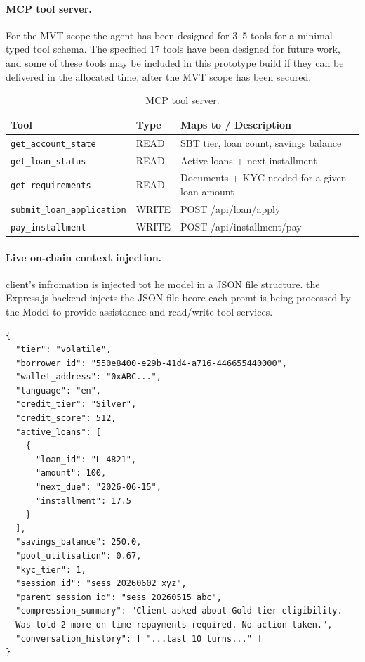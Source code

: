 \documentclass[12pt,a4paper]{report}
\newcommand{\tableheadcolor}{\rowcolor{TableHeadBg}}
\begin{document}
\paragraph{MCP tool server.} For the MVT scope the agent has been designed for 3--5 tools for a minimal typed tool schema. The specified 17 tools have been designed for future work, and some of these tools may be included in this prototype build if they can be delivered in the allocated time, after the MVT scope has been secured.

\begin{table}[H]
\centering
\caption[MCP tool server]{MCP tool server.}
\label{tab:mcp-tools}
\begin{tabular}{p{4.8cm}p{1.4cm}p{6.3cm}}
\toprule
\tableheadcolor
\textbf{Tool} & \textbf{Type} & \textbf{Maps to / Description} \\
\midrule
\texttt{get\_account\_state}       & READ & SBT tier, loan count, savings balance \\
\texttt{get\_loan\_status}         & READ & Active loans + next installment \\
\texttt{get\_requirements}         & READ & Documents + KYC needed for a given loan amount \\
\texttt{submit\_loan\_application} & WRITE & POST /api/loan/apply \\
\texttt{pay\_installment}          & WRITE & POST /api/installment/pay \\
\bottomrule
\end{tabular}
\end{table}

\paragraph{Live on-chain context injection.}
client's infromation is injected tot he model in a JSON file structure. the Express.js backend injects the JSON file beore each promt is being processed by the Model to provide assistacnce and read/write tool services.
\begin{verbatim}
{
  "tier": "volatile",
  "borrower_id": "550e8400-e29b-41d4-a716-446655440000",
  "wallet_address": "0xABC...",
  "language": "en",
  "credit_tier": "Silver",
  "credit_score": 512,
  "active_loans": [
    {
      "loan_id": "L-4821",
      "amount": 100,
      "next_due": "2026-06-15",
      "installment": 17.5
    }
  ],
  "savings_balance": 250.0,
  "pool_utilisation": 0.67,
  "kyc_tier": 1,
  "session_id": "sess_20260602_xyz",
  "parent_session_id": "sess_20260515_abc",
  "compression_summary": "Client asked about Gold tier eligibility.
  Was told 2 more on-time repayments required. No action taken.",
  "conversation_history": [ "...last 10 turns..." ]
}
\end{verbatim}
\end{document}
